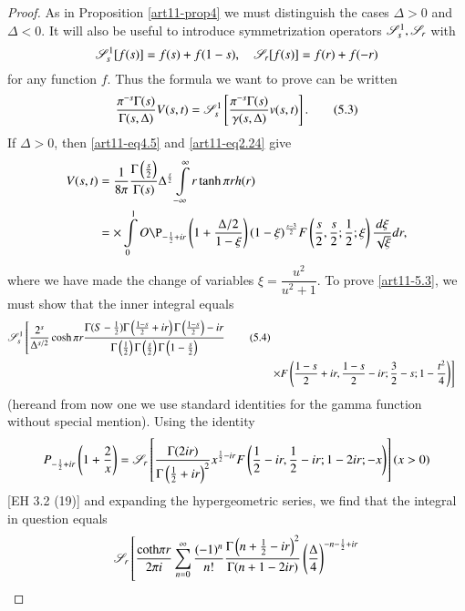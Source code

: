 \begin{proof}
As in Proposition \eqref{art11-prop4} we must distinguish the cases $\Delta > 0$ and $\Delta < 0$. It will also be useful  to introduce symmetrization operators $\mathscr{S}^1_s, \mathscr{S}_r$ with 
$$
\mathscr{S}^1_s [f(s)] = f(s) + f (1-s), \quad \mathscr{S}_r [f(s)] = f(r) + f (-r)
$$
for any function $f$. Thus the formula we want to prove can be written 
\begin{equation*}
\frac{\pi^{-s} \Gamma (s)}{\Gamma (s, \Delta)} V (s,t) = \mathscr{S}^1_s \left[\frac{\pi^{-s} \Gamma (s)}{\gamma (s, \Delta)} v (s,t) \right].
\tag{5.3}\label{art11-eq5.3}
\end{equation*}
If $\Delta >0$, then \eqref{art11-eq4.5} and \eqref{art11-eq2.24} give 
\begin{align*}
V(s,t) & =\frac{1}{8\pi} \frac{\Gamma \left(\frac{s}{2} \right)}{\Gamma (s)} \Delta^{\frac{s}{2}} \int\limits^\infty_{-\infty} r \tanh \pi r h (r)\\
& =\times \int\limits^1_0 O\P_{-\frac{1}{2} + ir} \left(1+ \frac{\Delta/ 2}{1-\xi} \right) (1-\xi)^{\frac{s-3}{2}} F \left(\frac{s}{2}, \frac{s}{2}; \frac{1}{2} ; \xi \right) \frac{d\xi}{\sqrt{\xi}} dr, 
\end{align*}
where we have made the change of variables $\xi =\dfrac{u^2}{u^2+1}$. To prove \eqref{art11-5.3}, we must show that the inner integral equals 
\begin{align*}
\mathscr{S}^1_s \left[\frac{2^s}{\Delta^{s/2}} \cosh \pi r \frac{\Gamma (S-\frac{1}{2}) \Gamma \left(\frac{1-s}{2} + ir \right) \Gamma \left(\frac{1-s}{2}\right) -ir}{\Gamma \left(\frac{1}{2} \right) \Gamma \left(\frac{s}{2} \right) \Gamma \left(1-\frac{s}{2} \right)} \right.
\tag{5.4}\label{art11-eq5.4}\\
& \left. \times F\left(\frac{1-s}{2} + i r, \frac{1-s}{2} - ir ; \frac{3}{2} - s ; 1 - \frac{t^2}{4} \right) \right]
\end{align*}
(here\pageoriginale and from now one we use standard identities for the gamma function without special mention). Using the identity 
$$
P_{-\frac{1}{2} + ir} \left(1+\frac{2}{x} \right) = \mathscr{S}_r 
\left[ \frac{\Gamma (2 ir)}{\Gamma \left(\frac{1}{2} + ir \right)^2} x^{\frac{1}{2} -ir} F \left(\frac{1}{2}  - ir ,\frac{1}{2}- ir; 1-2 ir; -x \right)\right] (x >0)
$$
[EH 3.2 (19)] and expanding the hypergeometric series, we find that the integral in question equals 
\begin{multline*}
\sS_r \left[\frac{\text{coth} \pi r}{2 \pi i} \sum\limits^\infty_{n=0} \frac{(-1)^n}{n!} \frac{\Gamma \left(n+ \frac{1}{2} - ir \right)^2}{\Gamma (n+1 - 2 i r)} \left(\frac{\Delta}{4} \right)^{-n -\frac{1}{2} + ir}  \right.\\

\end{multline*}
\end{proof}

